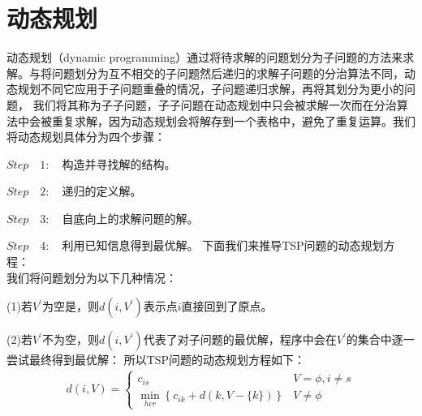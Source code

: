 \section{动态规划}
动态规划（dynamic programming）通过将待求解的问题划分为子问题的方法来求解。与将问题划分为互不相交的子问题然后递归的求解子问题的分治算法不同，动态规划不同它应用于子问题重叠的情况，子问题递归求解，再将其划分为更小的问题，
我们将其称为子子问题，子子问题在动态规划中只会被求解一次而在分治算法中会被重复求解，因为动态规划会将解存到一个表格中，避免了重复运算。我们将动态规划具体分为四个步骤：\\
\par
$Step \quad 1: \quad $构造并寻找解的结构。
\par
$Step \quad 2: \quad $递归的定义解。
\par
$Step \quad 3: \quad $自底向上的求解问题的解。
\par
$Step \quad 4: \quad $利用已知信息得到最优解。
下面我们来推导TSP问题的动态规划方程：\\
我们将问题划分为以下几种情况：
\par
(1)若$V^{'}$为空是，则$d(i,V^{'})$表示点$i$直接回到了原点。
\par
(2)若$V^{'}$不为空，则$d(i,V^{'})$代表了对子问题的最优解，程序中会在$V^{'}$的集合中逐一尝试最终得到最优解：
所以TSP问题的动态规划方程如下：
\begin{align}
    d(i, V)=\left\{\begin{array}{ll}c_{i s} & V=\phi, i \neq s \\\min _{h c r}\left\{c_{i k}+d(k, V-\{k\})\right\} & V \neq \phi\end{array}\right.
\end{align}

